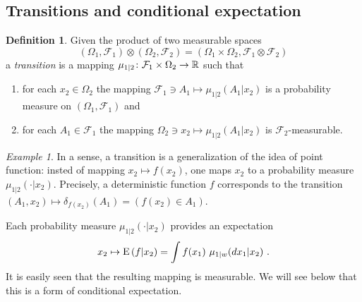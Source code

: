 \documentclass[12pt,a4paper]{amsart}
\theoremstyle{plain}%
\theoremstyle{definition}
\newtheorem{definition}{Definition}%
\theoremstyle{remark}
\newtheorem{example}{Example}
\begin{document}

\subsection{Transitions and conditional expectation}
\label{sec:trans-cond-expect}

 \begin{definition}
Given the product of two measurable spaces  \[(\Omega_1, \mathcal F_1)\otimes(\Omega_2, \mathcal F_2) = (\Omega_1\times\Omega_2, \mathcal F_1 \otimes \mathcal F_2)\] a \emph{transition} is a mapping $\mu_{1|2} \colon \mathcal F_1 \times \Omega_2 \to \mathbb{R}$ such that
  \begin{enumerate}
  \item for each $x_2 \in \Omega_2$ the mapping $\mathcal F_1 \ni A_1 \mapsto \mu_{1|2}(A_1|x_2)$ is a probability measure on $(\Omega_1,\mathcal F_1)$ and
  \item for each $A_1 \in \mathcal F_1$ the mapping $\Omega_2 \ni x_2 \mapsto \mu_{1|2}(A_1|x_2)$ is $\mathcal F_2$-measurable.
  \end{enumerate}
\end{definition}

\begin{example}
In a sense, a transition is a generalization of the idea of point
function: insted of mapping $x_2 \mapsto f(x_2)$, one maps $x_2$ to a
probability measure $\mu_{1|2}(\cdot|x_2)$. Precisely, a deterministic
function $f$ corresponds to the transition $(A_1,x_2) \mapsto
\delta_{f(x_2)}(A_1) = (f(x_2) \in A_1)$. 
\end{example}

Each probability measure $\mu_{1|2}(\cdot|x_2)$ provides an
expectation \[x_2 \mapsto \operatorname{E}\left(f \middle| x_2\right) = \int f(x_1) \
  \mu_{1|w}(dx_1|x_2) \ .\]
It is easily seen that the resulting mapping is measurable. We will
see below that this is a form of conditional expectation.
\end{document}
